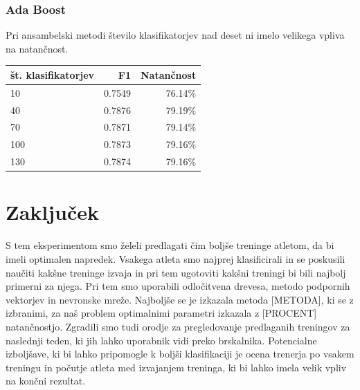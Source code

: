 \documentclass{acm_proc_article-sp}
\begin{document}
\subsubsection{Ada Boost}
Pri ansambelski metodi število klasifikatorjev nad deset ni imelo velikega vpliva na natančnost.
\begin{center}
 \small
 \setlength{\tabcolsep}{3pt}
 \begin{tabular}{|l r r|}
 \hline
   št. klasifikatorjev & F1 & Natančnost \\
  \hline \hline
  10 & 0.7549 & 76.14\% \\
  \hline
  40 & 0.7876 & 79.19\% \\
  \hline
  70 & 0.7871 & 79.14\% \\
  \hline
  100 & 0.7873 & 79.16\% \\
  \hline
  130 & 0.7874 & 79.16\% \\
  \hline
 \end{tabular}
\end{center}
\normalsize


\section{Zaključek}
S tem eksperimentom smo želeli predlagati čim boljše treninge atletom, da bi imeli optimalen napredek.
Vsakega atleta smo najprej klasificirali in se poskusili naučiti kakšne treninge izvaja in pri tem ugotoviti kakšni treningi bi bili najbolj primerni za njega.
Pri tem smo uporabili odločitvena drevesa, metodo podpornih vektorjev in nevronske mreže.
Najboljše se je izkazala metoda [METODA], ki se z izbranimi, za naš problem optimalnimi parametri izkazala z [PROCENT] natančnostjo.
Zgradili smo tudi orodje za pregledovanje predlaganih treningov za naslednji teden, ki jih lahko uporabnik vidi preko brskalnika.
Potencialne izboljšave, ki bi lahko pripomogle k boljši klasifikaciji je ocena trenerja po vsakem treningu in počutje atleta med izvajanjem treninga, ki bi lahko imela velik vpliv na končni rezultat.

%

%
%

\balancecolumns
\end{document}
